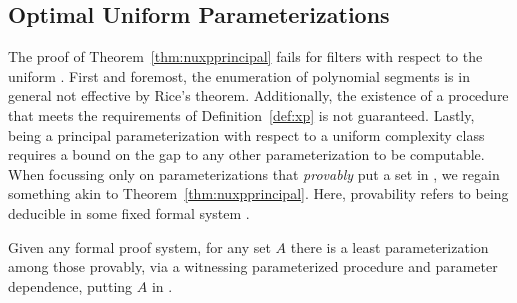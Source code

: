 \subsection{Optimal Uniform Parameterizations}
The proof of Theorem~\ref{thm:nuxpprincipal} fails for filters with respect to the uniform .
First and foremost, the enumeration of polynomial segments is in general not effective by Rice's theorem.
Additionally, the existence of a procedure that meets the requirements of Definition~\ref{def:xp} is not guaranteed.
Lastly, being a principal parameterization with respect to a uniform complexity class requires a bound on the gap to any other parameterization to be computable.
When focussing only on parameterizations that \emph{provably} put a set in , we regain something akin to Theorem~\ref{thm:nuxpprincipal}.
Here, provability refers to being deducible in some fixed formal system \parencite{kleene1967mathematical}.
\begin{theorem}
\label{thm:xpprincipal}
  Given any formal proof system, for any set $A$ there is a least parameterization among those provably, via a witnessing parameterized procedure and parameter dependence, putting $A$ in .
\end{theorem}
